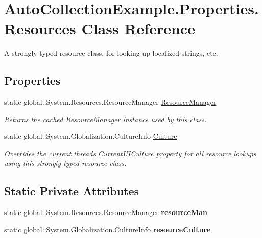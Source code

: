 \hypertarget{class_auto_collection_example_1_1_properties_1_1_resources}{}\section{Auto\+Collection\+Example.\+Properties.\+Resources Class Reference}
\label{class_auto_collection_example_1_1_properties_1_1_resources}


A strongly-\/typed resource class, for looking up localized strings, etc.  


\subsection*{Properties}
\begin{DoxyCompactItemize}
\item 
static global\+::\+System.\+Resources.\+Resource\+Manager \mbox{\hyperlink{class_auto_collection_example_1_1_properties_1_1_resources_ab57f8050c4de71b8716a6bc5f96d78bf}{Resource\+Manager}}
\begin{DoxyCompactList}\small\item\em Returns the cached Resource\+Manager instance used by this class. \end{DoxyCompactList}\item 
static global\+::\+System.\+Globalization.\+Culture\+Info \mbox{\hyperlink{class_auto_collection_example_1_1_properties_1_1_resources_ac618c023106ef0f37bd7c3a59cc8deba}{Culture}}
\begin{DoxyCompactList}\small\item\em Overrides the current thread\textquotesingle{}s Current\+U\+I\+Culture property for all resource lookups using this strongly typed resource class. \end{DoxyCompactList}\end{DoxyCompactItemize}
\subsection*{Static Private Attributes}
\begin{DoxyCompactItemize}
\item 
\mbox{\label{class_auto_collection_example_1_1_properties_1_1_resources_a7b1f5f368991cc03af91c362db98bbb0}} 
static global\+::\+System.\+Resources.\+Resource\+Manager {\bfseries resource\+Man}
\item 
\mbox{\label{class_auto_collection_example_1_1_properties_1_1_resources_a8568004c369ea2d19162f349555291ff}} 
static global\+::\+System.\+Globalization.\+Culture\+Info {\bfseries resource\+Culture}
\end{DoxyCompactItemize}


